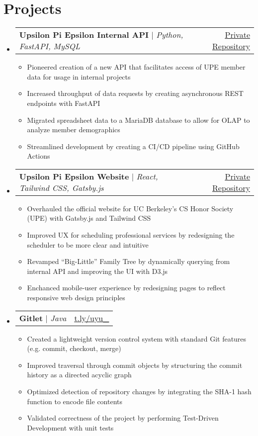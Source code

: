 \documentclass[letterpaper,11pt]{article}
\makeatletter
\newcommand{\resumeItem}[1]{
  \item\small{
    {#1 \vspace{-2pt}}
  }
}
\newcommand{\resumeProjectHeading}[2]{
    \item
    \begin{tabular*}{0.97\textwidth}{l@{\extracolsep{\fill}}r}
      \small#1 & #2 \\
    \end{tabular*}\vspace{-7pt}
}
\newcommand{\resumeSubHeadingListStart}{\begin{itemize}[leftmargin=0.15in, label={}]}
\newcommand{\resumeSubHeadingListEnd}{\end{itemize}}
\newcommand{\resumeItemListStart}{\begin{itemize}}
\newcommand{\resumeItemListEnd}{\end{itemize}\vspace{-5pt}}
\makeatother
\begin{document}
\section{\textbf{Projects}}
    \resumeSubHeadingListStart
      \resumeProjectHeading
          {\textbf{Upsilon Pi Epsilon Internal API} $|$ \emph{Python, FastAPI, MySQL}}{\href{https://github.com/upenu}{\underline{Private Repository}}}
          \resumeItemListStart
            \resumeItem{Pioneered creation of a new API that facilitates access of UPE member data for usage in internal projects}
            \resumeItem{Increased throughput of data requests by creating asynchronous REST endpoints with FastAPI}
            \resumeItem{Migrated spreadsheet data to a MariaDB database to allow for OLAP to analyze member demographics}
            \resumeItem{Streamlined development by creating a CI/CD pipeline using GitHub Actions}
          \resumeItemListEnd
      \resumeProjectHeading
          {\textbf{Upsilon Pi Epsilon Website} $|$ \emph{React, Tailwind CSS, Gatsby.js}}{\href{https://github.com/upenu}{\underline{Private Repository}}}
          \resumeItemListStart
            \resumeItem{Overhauled the official website for UC Berkeley's CS Honor Society (UPE) with Gatsby.js and Tailwind CSS}
            \resumeItem{Improved UX for scheduling professional services by redesigning the scheduler to be more clear and intuitive}
            \resumeItem{Revamped ``Big-Little'' Family Tree by dynamically querying from internal API and improving the UI with D3.js}
            \resumeItem{Enchanced mobile-user experience by redesigning pages to reflect responsive web design principles}
          \resumeItemListEnd
      \resumeProjectHeading
          {\textbf{Gitlet} $|$ \emph{Java}}{\href{https://gitfront.io/r/huytt621/6546c41e067e9f94621b90d764d7d16da3abb527/gitlet/}{\underline{t.ly/uyu\_}}}
          \resumeItemListStart
            \resumeItem{Created a lightweight version control system with standard Git features (e.g. commit, checkout, merge)}
            \resumeItem{Improved traversal through commit objects by structuring the commit history as a directed acyclic graph}
            \resumeItem{Optimized detection of repository changes by integrating the SHA-1 hash function to encode file contents}
            \resumeItem{Validated correctness of the project by performing Test-Driven Development with unit tests}
          \resumeItemListEnd
    \resumeSubHeadingListEnd



\end{document}
